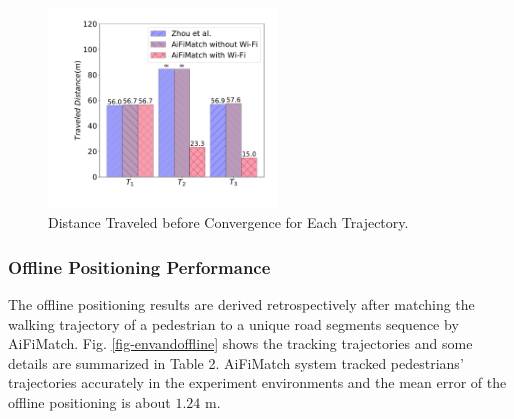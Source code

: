 \documentclass[conference]{IEEEtran}
\begin{document}
\begin{figure}[!htbp]
	\centering
	\includegraphics[width=2.4in]{AiFiMatch-Convergence}
	\caption{Distance Traveled before Convergence for Each Trajectory.}
	\label{fig-converg}
\end{figure}

\subsubsection{Offline Positioning Performance}

The offline positioning results are derived retrospectively after matching the walking trajectory of a pedestrian to a unique road segments sequence by AiFiMatch. Fig. \ref{fig-envandoffline} shows the tracking trajectories and some details are summarized in Table 2. AiFiMatch system tracked pedestrians' trajectories accurately in the experiment environments and the mean error of the offline positioning is about $1.24$ m.
\end{document}

